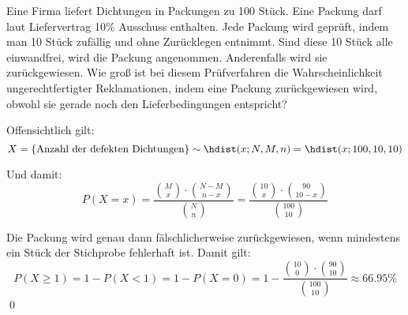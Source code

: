 \documentclass{abgabe}
\begin{document}
\begin{questions}
    \question
    Eine Firma liefert Dichtungen in Packungen zu 100 Stück. 
    Eine Packung darf laut Liefervertrag 10\% Ausschuss enthalten. 
    Jede Packung wird geprüft, indem man 10 Stück zufällig und ohne Zurücklegen entnimmt. 
    Sind diese 10 Stück alle einwandfrei, wird die Packung angenommen. 
    Anderenfalls wird sie zurückgewiesen.
    Wie groß ist bei diesem Prüfverfahren die Wahrscheinlichkeit ungerechtfertigter Reklamationen, indem eine Packung zurückgewiesen wird, obwohl sie gerade noch den Lieferbedingungen entspricht?
    \begin{solution}
        Offensichtlich gilt: 
        \[ 
            X = \{ \text{Anzahl der defekten Dichtungen} \} \sim \hdist(x;N,M,n) = \hdist(x;100,10,10)
        \] 

        Und damit: 
        \[ 
            P(X = x) = \frac{\binom{M}{x} \cdot \binom{N-M}{n-x}}{\binom{N}{n}} = \frac{\binom{10}{x} \cdot \binom{90}{10-x}}{\binom{100}{10}}
        \] 

        Die Packung wird genau dann fälschlicherweise zurückgewiesen, wenn mindestens ein Stück der Stichprobe fehlerhaft ist.
        Damit gilt: 
        \[ 
        P(X \geq 1) = 1 - P(X < 1) = 1 - P(X = 0) = 1 - \frac{\binom{10}{0} \cdot \binom{90}{10}}{\binom{100}{10}} \approx 66.95\%
        \]
        \qed
    \end{solution}
\end{questions}
\end{document}
